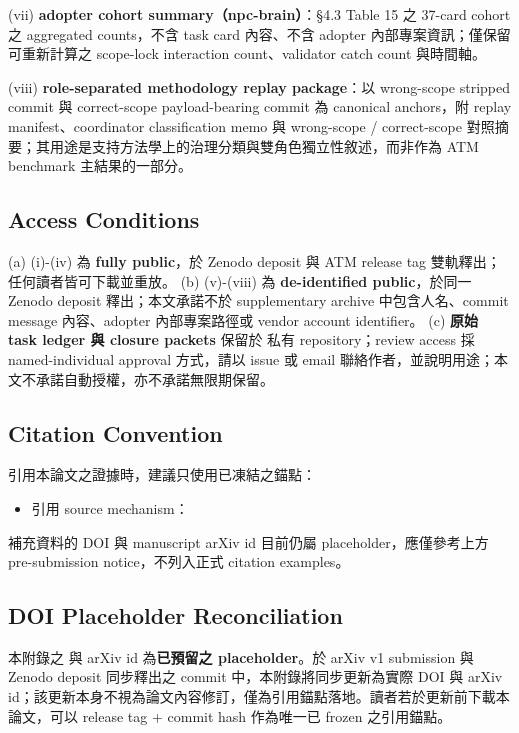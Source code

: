 \documentclass[a4paper,fontset=none]{ctexart}
\begin{document}
(vii) \textbf{adopter cohort summary（npc-brain）}：§4.3 Table 15 之 37-card cohort 之 aggregated counts，不含 task card 內容、不含 adopter 內部專案資訊；僅保留可重新計算之 scope-lock interaction count、validator catch count 與時間軸。

(viii) \textbf{role-separated methodology replay package}：以 wrong-scope stripped commit \texttt{} 與 correct-scope payload-bearing commit \texttt{} 為 canonical anchors，附 replay manifest、coordinator classification memo 與 wrong-scope / correct-scope 對照摘要；其用途是支持方法學上的治理分類與雙角色獨立性敘述，而非作為 ATM benchmark 主結果的一部分。

\subsection*{Access Conditions}

(a) (i)-(iv) 為 \textbf{fully public}，於 Zenodo deposit 與 ATM release tag 雙軌釋出；任何讀者皆可下載並重放。 (b) (v)-(viii) 為 \textbf{de-identified public}，於同一 Zenodo deposit 釋出；本文承諾不於 supplementary archive 中包含人名、commit message 內容、adopter 內部專案路徑或 vendor account identifier。 (c) \textbf{原始 task ledger 與 closure packets} 保留於 \texttt{} 私有 repository；review access 採 named-individual approval 方式，請以 issue 或 email 聯絡作者，並說明用途；本文不承諾自動授權，亦不承諾無限期保留。

\subsection*{Citation Convention}

引用本論文之證據時，建議只使用已凍結之錨點：

\begin{itemize}
\item 引用 source mechanism：\texttt{}
\end{itemize}

補充資料的 DOI 與 manuscript arXiv id 目前仍屬 placeholder，應僅參考上方 pre-submission notice，不列入正式 citation examples。

\subsection*{DOI Placeholder Reconciliation}

本附錄之 \texttt{} 與 arXiv id 為\textbf{已預留之 placeholder}。於 arXiv v1 submission 與 Zenodo deposit 同步釋出之 commit 中，本附錄將同步更新為實際 DOI 與 arXiv id；該更新本身不視為論文內容修訂，僅為引用錨點落地。讀者若於更新前下載本論文，可以 release tag \texttt{} + commit hash 作為唯一已 frozen 之引用錨點。

\nocite{*}


\end{document}
